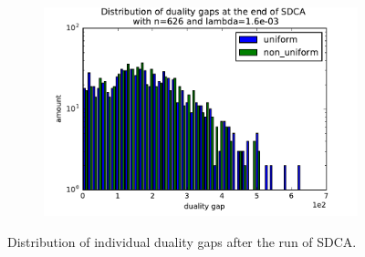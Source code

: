 \documentclass{beamer}
\DeclareMathOperator{\1}{\mathbb{1}}
\begin{document}
\begin{frame}
\begin{figure}
\begin{subfigure}[t]{0.3\textwidth}
    \end{subfigure}
    ~
    \begin{subfigure}[t]{0.3\textwidth}
        \centering
        \includegraphics[width=\textwidth]{images/20170914_040725_ocr_optdualgaps.pdf}
    \end{subfigure}
    \caption{Distribution of individual duality gaps after the run of SDCA.}
	\label{ocr duality gaps}
\end{figure}
\end{frame}



%
%
\end{document}
